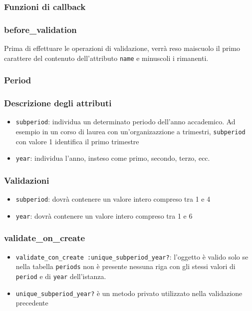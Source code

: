 \documentclass[11pt,a4paper]{article}
\begin{document}
\subsubsection*{Funzioni di callback}
\subsubsection*{before\_validation}
Prima di effettuare le operazioni di validazione, verrà reso maiscuolo il primo carattere del contenuto dell'attributo \verb|name| e minuscoli i rimanenti.
\subsubsection{Period}
\subsubsection*{Descrizione degli attributi}
\begin{itemize}
 \item \verb|subperiod|: individua un determinato periodo dell'anno accademico. Ad esempio in un corso di laurea con un'organizazzione a trimestri, \verb|subperiod| con valore 1 identifica il primo trimestre
 \item \verb|year|: individua l'anno, insteso come primo, secondo, terzo, ecc.
\end{itemize}
\subsubsection*{Validazioni}
\begin{itemize}
 \item \verb|subperiod|: dovrà contenere un valore intero compreso tra 1 e 4
\item \verb|year|: dovrà contenere un valore intero compreso tra 1 e 6
\end{itemize}
\subsubsection*{validate\_on\_create} 
\begin{itemize}
 \item \verb|validate_con_create :unique_subperiod_year?|: l'oggetto è valido solo se nella tabella \verb|periods| non è presente nessuna riga con gli stessi valori di \verb|period| e di \verb|year| dell'istanza.
 \item \verb|unique_subperiod_year?| è un metodo privato utilizzato nella validazione precedente
\end{itemize}
\end{document}
